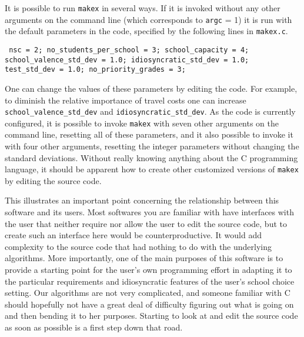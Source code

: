 \documentclass[12pt]{article}
\theoremstyle{definition}
\begin{document}
It is possible to run \texttt{makex} in several ways.  If it is
invoked without any other arguments on the command line (which
corresponds to \texttt{argc} = 1) it is run with the default
parameters in the code, specified by the following lines in
\texttt{makex.c}.
\begin{obeylines}\texttt{
  nsc = 2;
  no\_students\_per\_school = 3;
  school\_capacity = 4;
  school\_valence\_std\_dev = 1.0;
  idiosyncratic\_std\_dev = 1.0;
  test\_std\_dev = 1.0;
  no\_priority\_grades = 3;
}
\end{obeylines} \noindent
One can change the values of these parameters by editing the code.
For example, to diminish the relative importance of travel costs one
can increase \texttt{school\_valence\_std\_dev} and
\texttt{idiosyncratic\_std\_dev}.  As the code is currently
configured, it is possible to invoke \texttt{makex} with seven other
arguments on the command line, resetting all of these parameters, and
it also possible to invoke it with four other arguments, resetting the
integer parameters without changing the standard deviations.  Without
really knowing anything about the C programming language, it should be
apparent how to create other customized versions of \texttt{makex} by
editing the source code.

This illustrates an important point concerning the relationship
between this software and its users.  Most softwares you are familiar
with have interfaces with the user that neither require nor allow the
user to edit the source code, but to create such an interface here
would be counterproductive. It would add complexity to the source code
that had nothing to do with the underlying algorithms.  More
importantly, one of the main purposes of this software is to provide a
starting point for the user's own programming effort in adapting it to
the particular requirements and idiosyncratic features of the user's
school choice setting.  Our algorithms are not very complicated, and
someone familiar with C should hopefully not have a great deal of
difficulty figuring out what is going on and then bending it to her
purposes.  Starting to look at and edit the source code as soon as
possible is a first step down that road.

\end{document}
